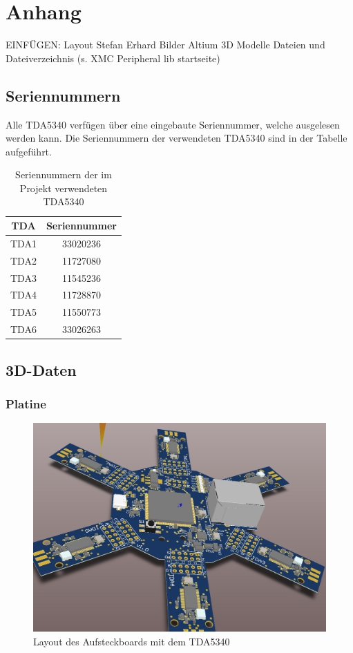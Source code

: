 \chapter{Anhang}
\label{sec:Anhang}
\pagestyle{scrheadings}
EINFÜGEN:
Layout Stefan Erhard
Bilder Altium
3D Modelle
Dateien und Dateiverzeichnis (s. XMC Peripheral lib startseite)

\section{Seriennummern}
\label{app:Seriennummern}
Alle TDA5340 verfügen über eine eingebaute Seriennummer, welche ausgelesen werden kann. Die Seriennummern der verwendeten TDA5340 sind in der Tabelle aufgeführt.
\begin{table}[h]
\centering
\begin{tabular}{cc}
TDA & Seriennummer\\
\hline
TDA1 & 33020236\\
TDA2 & 11727080\\
TDA3& 11545236\\
TDA4& 11728870\\
TDA5& 11550773\\
TDA6& 33026263\\
\end{tabular}
\caption{Seriennummern der im Projekt verwendeten TDA5340 }
\label{default}
\end{table}

\section{3D-Daten}
\subsection{Platine}
\begin{figure}[h] 
	\centering
	\includegraphics[width=\textwidth]{Abbildungen/Aufnahmen/Bilder/Altium/3D2}
	\caption{Layout des Aufsteckboards mit dem TDA5340}
	\label{fig:3D}
\end{figure}

